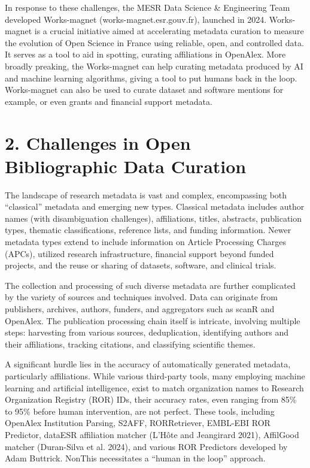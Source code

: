 \documentclass[
]{article}
\begin{document}
In response to these challenges, the MESR Data Science \& Engineering
Team developed Works-magnet (works-magnet.esr.gouv.fr), launched in
2024. Works-magnet is a crucial initiative aimed at accelerating
metadata curation to measure the evolution of Open Science in France
using reliable, open, and controlled data. It serves as a tool to aid in
spotting, curating affiliations in OpenAlex. More broadly preaking, the
Works-magnet can help curating metadata produced by AI and machine
learning algorithms, giving a tool to put humans back in the loop.
Works-magnet can also be used to curate dataset and software mentions
for example, or even grants and financial support metadata.

\hypertarget{challenges-in-open-bibliographic-data-curation}{%
\section{2. Challenges in Open Bibliographic Data
Curation}\label{challenges-in-open-bibliographic-data-curation}}

The landscape of research metadata is vast and complex, encompassing
both ``classical'' metadata and emerging new types. Classical metadata
includes author names (with disambiguation challenges), affiliations,
titles, abstracts, publication types, thematic classifications,
reference lists, and funding information. Newer metadata types extend to
include information on Article Processing Charges (APCs), utilized
research infrastructure, financial support beyond funded projects, and
the reuse or sharing of datasets, software, and clinical trials.

The collection and processing of such diverse metadata are further
complicated by the variety of sources and techniques involved. Data can
originate from publishers, archives, authors, funders, and aggregators
such as scanR and OpenAlex. The publication processing chain itself is
intricate, involving multiple steps: harvesting from various sources,
deduplication, identifying authors and their affiliations, tracking
citations, and classifying scientific themes.

A significant hurdle lies in the accuracy of automatically generated
metadata, particularly affiliations. While various third-party tools,
many employing machine learning and artificial intelligence, exist to
match organization names to Research Organization Registry (ROR) IDs,
their accuracy rates, even ranging from 85\% to 95\% before human
intervention, are not perfect. These tools, including OpenAlex
Institution Parsing, S2AFF, RORRetriever, EMBL-EBI ROR Predictor,
dataESR affiliation matcher (L'Hôte and Jeangirard 2021), AffilGood
matcher (Duran-Silva et al. 2024), and various ROR Predictors developed
by Adam Buttrick. NonThis necessitates a ``human in the loop'' approach.
\end{document}
